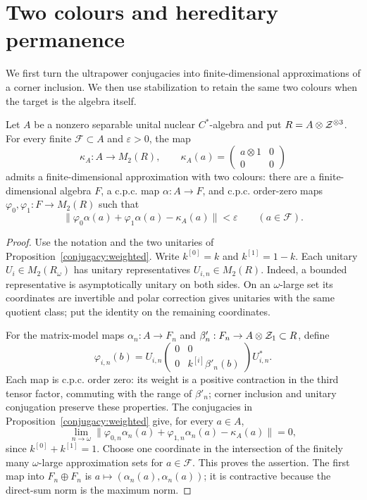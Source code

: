 \section{Two colours and hereditary permanence}
\label{sec:endgame}

We first turn the ultrapower conjugacies into finite-dimensional
approximations of a corner inclusion. We then use stabilization to
retain the same two colours when the target is the algebra itself.

\begin{proposition}
\label{end:corner}
Let $A$ be a nonzero separable unital nuclear $C^*$-algebra and put
$R=A\otimes\mathcal Z^{\otimes3}$. For every finite $\mathcal F\subset A$
and $\varepsilon>0$, the map
\[
 \kappa_A:A\longrightarrow M_2(R),\qquad
 \kappa_A(a)=\begin{pmatrix}a\otimes1&0\\0&0\end{pmatrix}
\]
admits a finite-dimensional approximation with two colours:
there are a finite-dimensional algebra $F$, a c.p.c. map
$\alpha:A\to F$, and c.p.c. order-zero maps
$\varphi_0,\varphi_1:F\to M_2(R)$ such that
\[
 \|\varphi_0\alpha(a)+\varphi_1\alpha(a)-\kappa_A(a)\|
 <\varepsilon\qquad(a\in\mathcal F).
\]
\end{proposition}

\begin{proof}
Use the notation and the two unitaries of
Proposition~\ref{conjugacy:weighted}. Write $k^{[0]}=k$ and $k^{[1]}=1-k$.
Each unitary $U_i\in M_2(R_\omega)$ has unitary representatives
$U_{i,n}\in M_2(R)$. Indeed, a bounded representative is asymptotically
unitary on both sides. On an $\omega$-large set its coordinates are
invertible and polar correction gives unitaries with the same quotient
class; put the identity on the remaining coordinates.

For the matrix-model maps $\alpha_n:A\to F_n$ and
$\beta'_n:F_n\to A\otimes\mathcal Z_1\subset R$, define
\[
 \varphi_{i,n}(b)
 =U_{i,n}\begin{pmatrix}0&0\\0&k^{[i]}\beta'_n(b)\end{pmatrix}U_{i,n}^*.
\]
Each map is c.p.c. order zero: its weight is a positive contraction
in the third tensor factor, commuting with the range of $\beta'_n$;
corner inclusion and unitary conjugation preserve these properties.
The conjugacies in Proposition~\ref{conjugacy:weighted} give, for every $a\in A$,
\[
 \lim_{n\to\omega}
 \|\varphi_{0,n}\alpha_n(a)+\varphi_{1,n}\alpha_n(a)-\kappa_A(a)\|=0,
\]
since $k^{[0]}+k^{[1]}=1$. Choose one coordinate in the intersection
of the finitely many $\omega$-large approximation sets for
$a\in\mathcal F$. This proves the assertion. The first map into
$F_n\oplus F_n$ is $a\mapsto(\alpha_n(a),\alpha_n(a))$;
it is contractive because the direct-sum norm is the maximum norm.
\end{proof}

